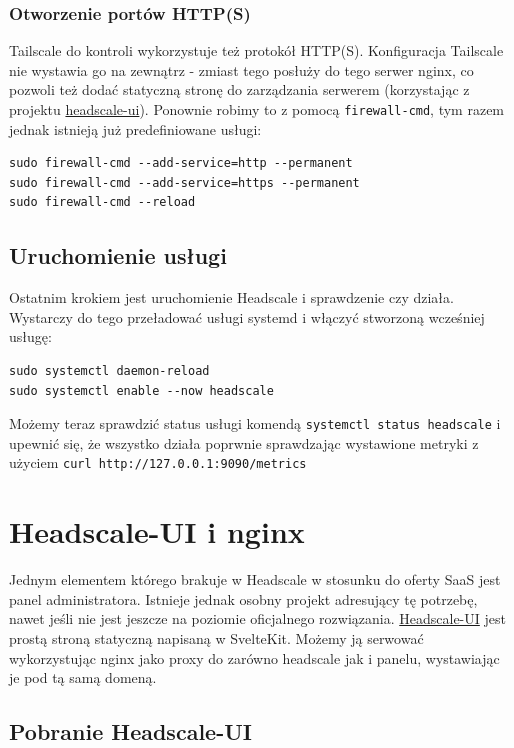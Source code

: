 \documentclass[../main.tex]{subfiles}
\begin{document}
\subsubsection{Otworzenie portów HTTP(S)}
Tailscale do kontroli wykorzystuje też protokół HTTP(S). Konfiguracja Tailscale nie wystawia go na zewnątrz - zmiast tego posłuży do tego serwer nginx, co pozwoli też dodać statyczną stronę do zarządzania serwerem (korzystając z projektu \href{https://github.com/gurucomputing/headscale-ui}{headscale-ui}). Ponownie robimy to z pomocą \texttt{firewall-cmd}, tym razem jednak istnieją już predefiniowane usługi:
\begin{verbatim}
sudo firewall-cmd --add-service=http --permanent
sudo firewall-cmd --add-service=https --permanent
sudo firewall-cmd --reload
\end{verbatim}
\subsection{Uruchomienie usługi}
Ostatnim krokiem jest uruchomienie Headscale i sprawdzenie czy działa. Wystarczy do tego przeładować usługi systemd i włączyć stworzoną wcześniej usługę:
\begin{verbatim}
sudo systemctl daemon-reload
sudo systemctl enable --now headscale
\end{verbatim}
Możemy teraz sprawdzić status usługi komendą \texttt{systemctl status headscale} i upewnić się, że wszystko działa poprwnie sprawdzając wystawione metryki z użyciem \texttt{curl http://127.0.0.1:9090/metrics}

\section{Headscale-UI i nginx}

Jednym elementem którego brakuje w Headscale w stosunku do oferty SaaS jest panel administratora. Istnieje jednak osobny projekt adresujący tę potrzebę, nawet jeśli nie jest jeszcze na poziomie oficjalnego rozwiązania. \href{https://github.com/gurucomputing/headscale-ui}{Headscale-UI} jest prostą stroną statyczną napisaną w SvelteKit. Możemy ją serwować wykorzystując nginx jako proxy do zarówno headscale jak i panelu, wystawiając je pod tą samą domeną.

\subsection{Pobranie Headscale-UI}
\end{document}
